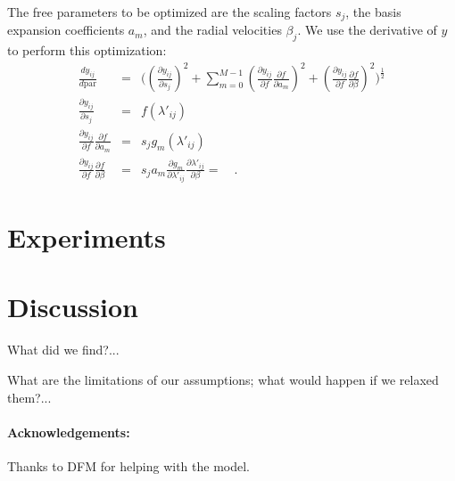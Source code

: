 \documentclass[12pt, letterpaper]{article}
\begin{document}
The free parameters to be optimized are the scaling factors $s_j$, the basis expansion
coefficients $a_m$, and the radial velocities $\beta_j$. We use the derivative of 
$y$ to perform this optimization:
\begin{eqnarray}
   \frac{dy_{ij}}{d \mathrm{par}} &=& \Big((\frac{\partial y_{ij}}{\partial s_j})^2 + 
   \sum_{m=0}^{M-1}(\frac{\partial y_{ij}}{\partial f} \frac{\partial f}{\partial a_m})^2 + 
  (\frac{\partial y_{ij}}{\partial f} \frac{\partial f}{\partial \beta})^2\Big)^{\frac{1}{2}}
  \\
  \frac{\partial y_{ij}}{\partial s_j} &=& f(\lambda'_{ij})
  \\
  \frac{\partial y_{ij}}{\partial f} \frac{\partial f}{\partial a_m} &=& s_j g_m(\lambda'_{ij})
  \\
  \frac{\partial y_{ij}}{\partial f} \frac{\partial f}{\partial \beta} &=& s_j a_m \frac{\partial g_m}{\partial \lambda'_{ij}}
  \frac{\partial \lambda'_{ij}}{\partial \beta} = 
  \quad . 
\end{eqnarray}

\section{Experiments}

\section{Discussion}

What did we find?...

What are the limitations of our assumptions; what would happen if we relaxed them?...

\paragraph{Acknowledgements:}
Thanks to DFM for helping with the model.
\end{document}
